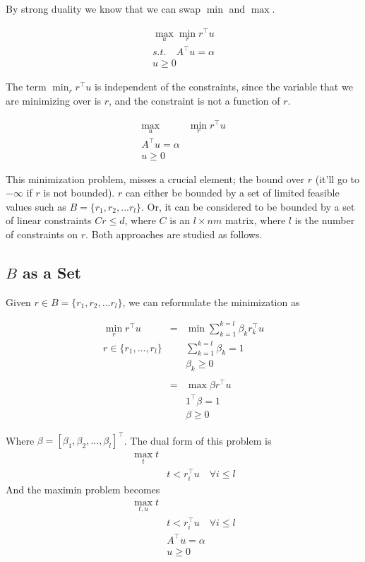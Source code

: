\documentclass{article}
\theoremstyle{remark}
\theoremstyle{remark}
\theoremstyle{remark}
\theoremstyle{remark}
\theoremstyle{remark}
\theoremstyle{remark}
\begin{document}
By strong duality we know that we can swap $\min$ and $\max$.

$$
  \begin{matrix}
    \max_u \min_r r^\top  u \\
    s.t. \quad A^\top  u = \alpha \\
    u \geq 0
  \end{matrix}
$$

The term $\min_r r^\top  u$ is independent of the constraints, since the variable that we are minimizing over is $r$, and the constraint is not a function of $r$.

$$
  \begin{matrix}
    \max \limits_u & \min \limits_{r} r^\top u \\
    A^\top u = \alpha  & \\
    u \geq 0
  \end{matrix}
$$

This minimization problem, misses a crucial element; the bound over $r$ (it'll go to $-\infty$ if $r$ is not bounded). $r$ can either be bounded by a set of limited feasible values such as $B=\{r_1, r_2,...r_l\}$. Or, it can be considered to be bounded by a set of linear constraints $Cr \leq d$, where $C$ is an $l \times nm$ matrix, where $l$ is the number of constraints on $r$. Both approaches are studied as follows.


\subsection*{$B$ as a Set}

Given $r \in B=\{r_1, r_2,...r_l\}$, we can reformulate the minimization as

$$
  \begin{matrix}
    \min_r r^\top u  &=& \min \sum_{k = 1}^{k=l} \beta_k r_k^\top u\\
    r \in \{r_1,...,r_l\} & & \sum_{k = 1}^{k=l} \beta_k = 1\\
      & & \beta_k \geq 0 \\
      & & \\
      & = &\max \beta r^\top u \\
      & & 1^\top \beta = 1 \\
      & & \beta \geq 0
  \end{matrix}
$$

Where $\beta = [\beta_1, \beta_2, ..., \beta_l]^\top$. The dual form of this problem is
\[
  \begin{matrix}
    \max_t t & \\
     & t < r_i^\top u \quad \forall i \leq l
  \end{matrix}
\]
And the maximin problem becomes
\[
  \begin{matrix}
    \max_{t,u} t & \\
     & t < r_i^\top u \quad \forall i \leq l\\
     & A^\top  u = \alpha \\
     & u \geq 0 \\
  \end{matrix}
\]
\end{document}
